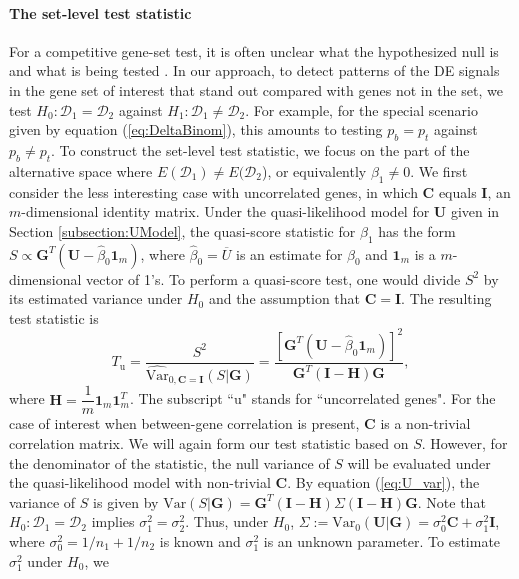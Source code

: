 	
	\paragraph{The set-level test statistic}\label{subsection:MEQL}
	For a competitive gene-set test, it is often unclear what the hypothesized null is and what is
	being tested \citep{barry2008statistical,wu2012camera}. In our approach, to detect patterns of 
	the DE signals in the gene set of interest that stand out compared with genes not in the set, 
	we test $H_0: \mathscr{D}_1=\mathscr{D}_2$ against $H_1: \mathscr{D}_1\ne\mathscr{D}_2$. For 
	example, for the special scenario given by equation (\ref{eq:DeltaBinom}), this amounts to 
	testing $p_{b}=p_{t}$ against $p_{b}\ne p_{t}$.
	To construct the set-level test statistic, we focus on the part of the alternative space where
	$E(\mathscr{D}_1)\ne E(\mathscr{D}_2$), or equivalently $\beta_1\ne 0$. We first consider the 
	less interesting case with uncorrelated genes, in which $\bm C$ equals $\bm I$, an 
	$m$-dimensional identity matrix. Under the quasi-likelihood model for $\bm U$ given in Section
	\ref{subsection:UModel},  the quasi-score statistic for $\beta_1$ has the form $S \propto \bm
	G^T(\bm U-\hat\beta_0\bm 1_m)$, where $\hat\beta_0=\overline{U}$ is an estimate for $\beta_0$ 
	and	$\bm 1_m$ is a $m$-dimensional vector of 1's. To perform a quasi-score test, one would 
	divide $S^2$ by its estimated variance under $H_0$ and the assumption that $\bm C=\bm I$. The 
	resulting test	statistic is 
	\begin{equation}
	T_{\text{u}} = \dfrac{S^2}{\widehat{\mbox{Var}}_{0, \bm C=\bm I}(S|\bm G)} = \dfrac{[\bm G^T(\bm
		U-\hat\beta_0\bm 1_m)]^2}{\bm G^T(\bm I-\bm H)\bm G}, 
	\end{equation}
	where $\bm H = \dfrac{1}{m}\bm 1_m\bm 1_m^T$. The subscript ``u" stands for ``uncorrelated 
	genes".	For the case of interest when between-gene correlation is present, $\bm C$ is a 
	non-trivial	correlation matrix. We will again form our test statistic based on $S$. However, 
	for the	denominator of the statistic, the null variance of $S$ will be evaluated under the 
	quasi-likelihood
	model with non-trivial $\bm C$. By equation (\ref{eq:U_var}), the variance of $S$ is given by
	$\mbox{Var}(S|\bm G) = \bm G^T(\bm I-\bm H)\Sigma(\bm I-\bm H)\bm G$. Note that $H_0:
	\mathscr{D}_1=\mathscr{D}_2$ implies $\sigma_1^2=\sigma_2^2$. Thus, under $H_0$,
	$\Sigma:=\mbox{Var}_{0}(\bm U|\bm G)=\sigma_0^2\bm C+\sigma_1^2\bm I$, where 
	$\sigma_0^2=1/n_1+1/n_2$
	is known and $\sigma_1^2$ is an unknown parameter. To estimate $\sigma_1^2$ under $H_0$, we 
